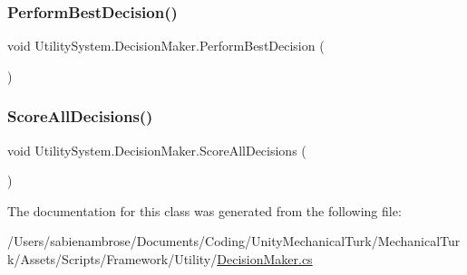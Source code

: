 \mbox{\label{class_utility_system_1_1_decision_maker_a51ccf99d911381b29ca61d69697e93dc}} 
\subsubsection{\texorpdfstring{Perform\+Best\+Decision()}{PerformBestDecision()}}
{\footnotesize\ttfamily void Utility\+System.\+Decision\+Maker.\+Perform\+Best\+Decision (\begin{DoxyParamCaption}{ }\end{DoxyParamCaption})}

\mbox{\label{class_utility_system_1_1_decision_maker_ac342e07ac99e8de808e7bbc9faa59a1a}} 
\subsubsection{\texorpdfstring{Score\+All\+Decisions()}{ScoreAllDecisions()}}
{\footnotesize\ttfamily void Utility\+System.\+Decision\+Maker.\+Score\+All\+Decisions (\begin{DoxyParamCaption}{ }\end{DoxyParamCaption})}



The documentation for this class was generated from the following file\+:\begin{DoxyCompactItemize}
\item 
/\+Users/sabienambrose/\+Documents/\+Coding/\+Unity\+Mechanical\+Turk/\+Mechanical\+Turk/\+Assets/\+Scripts/\+Framework/\+Utility/\mbox{\hyperlink{_decision_maker_8cs}{Decision\+Maker.\+cs}}\end{DoxyCompactItemize}
